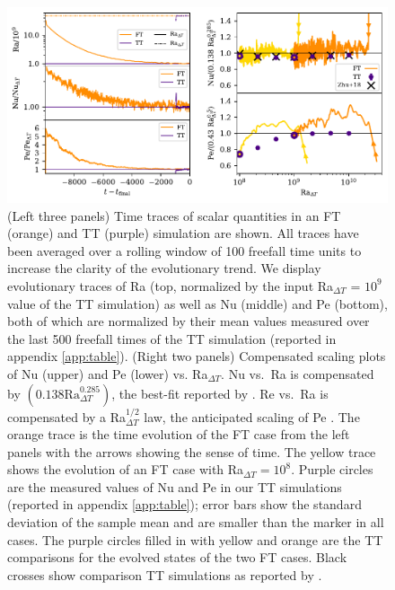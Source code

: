 \begin{figure}[t!]
\includegraphics[width=\textwidth]{./figs/rbc_scalar_comparisons.pdf}
\caption[Scalar time traces and parameter space scalings for FT and TT simulations]{ 
	(Left three panels) Time traces of scalar quantities in an FT (orange) and TT (purple) simulation are shown.
	All traces have been averaged over a rolling window of 100 freefall time units to increase the clarity of the evolutionary trend.
	We display evolutionary traces of Ra (top, normalized by the input Ra$_{\Delta T}$ = $10^9$ value of the TT simulation) as well as Nu (middle) and Pe (bottom), both of which are normalized by their mean values measured over the last 500 freefall times of the TT simulation (reported in appendix \ref{app:table}).
	(Right two panels) Compensated scaling plots of Nu (upper) and Pe (lower) vs. Ra$_{\Delta T}$.
	Nu vs.~Ra is compensated by $(0.138 \text{Ra}_{\Delta T}^{0.285})$, the best-fit reported by \citet{johnston&doering2009}.
	Re vs.~Ra is compensated by a Ra$_{\Delta T}^{1/2}$ law, the anticipated scaling of Pe \citep{ahlers&all2009}.
	The orange trace is the time evolution of the FT case from the left panels with the arrows showing the sense of time.
	The yellow trace shows the evolution of an FT case with Ra$_{\Delta T} = 10^8$.
	Purple circles are the measured values of Nu and Pe in our TT simulations (reported in appendix \ref{app:table}); error bars show the standard deviation of the sample mean and are smaller than the marker in all cases.
	The purple circles filled in with yellow and orange are the TT comparisons for the evolved states of the two FT cases.
	Black crosses show comparison TT simulations as reported by \citet{zhu&all2018}.
\label{fig:rbc_scalar_comparisons} }
\end{figure}



\vspace{-0.25cm}
